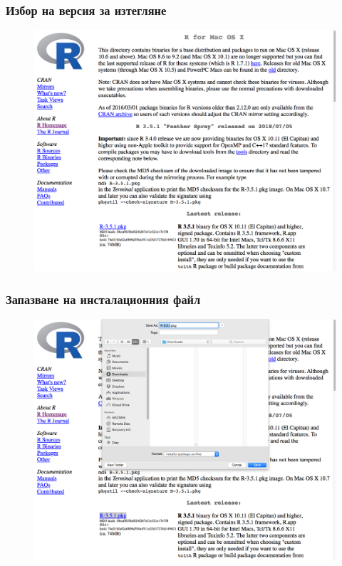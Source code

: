 \documentclass{beamer}
\begin{document}
\begin{frame}
\frametitle{Избор на версия за изтегляне}
\begin{figure}[]\includegraphics[width=\textwidth,height=0.75\textheight]{pic0004}\end{figure}
\end{frame}

\begin{frame}
\frametitle{Запазване на инсталационния файл}
\begin{figure}[]\includegraphics[width=\textwidth,height=0.75\textheight]{pic0005}\end{figure}
\end{frame}
\end{document}
